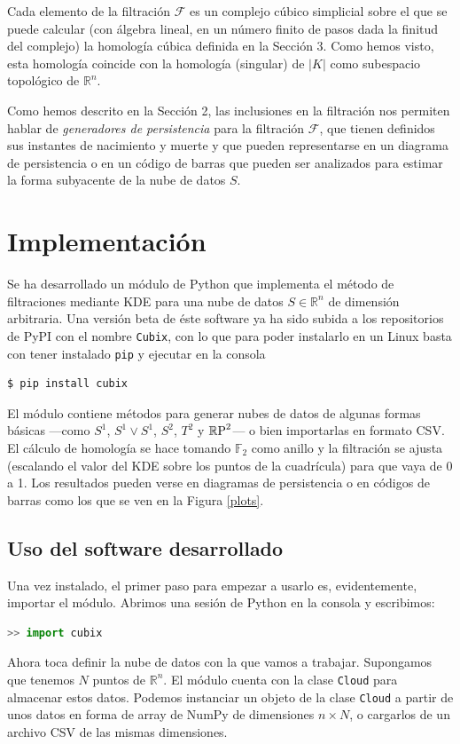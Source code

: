 \documentclass[12pt,a4paper,twoside]{article} %
\theoremstyle{plain}
\theoremstyle{definition}
\newcommand{\R}{\mathbb{R}}
\newcommand{\F}{\mathbb{F}}
\newcommand{\RP}{\mathbb{R}\textup{P}}
\begin{document}
Cada elemento de la filtración $\mathcal{F}$ es un complejo cúbico simplicial sobre el que se puede calcular (con álgebra lineal, en un número finito de pasos dada la finitud del complejo) la homología cúbica definida en la Sección 3. Como hemos visto, esta homología coincide con la homología (singular) de $\lvert K \rvert$ como subespacio topológico de $\R^n$.

Como hemos descrito en la Sección 2, las inclusiones en la filtración nos permiten hablar de \emph{generadores de persistencia} para la filtración $\mathcal{F}$, que tienen definidos sus instantes de nacimiento y muerte y que pueden representarse en un diagrama de persistencia o en un código de barras que pueden ser analizados para estimar la forma subyacente de la nube de datos $S$.

\newpage
\section{Implementación}

%
%

Se ha desarrollado un módulo de Python que implementa el método de filtraciones mediante KDE para una nube de datos $S \in \R^n$ de dimensión arbitraria. Una versión beta de éste software ya ha sido subida a los repositorios de PyPI con el nombre \texttt{Cubix}, con lo que para poder instalarlo en un Linux basta con tener instalado \texttt{pip} y ejecutar en la consola

\begin{lstlisting}[language=bash]
  $ pip install cubix 
\end{lstlisting}

El módulo contiene métodos para generar nubes de datos de algunas formas básicas ---como $S^1$, $S^1 \vee S^1$, $S^2$, $T^2$ y $\RP^2$--- o bien importarlas en formato CSV. El cálculo de homología se hace tomando $\F_2$ como anillo y la filtración se ajusta (escalando el valor del KDE sobre los puntos de la cuadrícula) para que vaya de 0 a 1. Los resultados pueden verse en diagramas de persistencia o en códigos de barras como los que se ven en la Figura \ref{plots}.

\subsection{Uso del software desarrollado}
Una vez instalado, el primer paso para empezar a usarlo es, evidentemente, importar el módulo. Abrimos una sesión de Python en la consola y escribimos:
\begin{lstlisting}[language=python]
  >> import cubix 
\end{lstlisting}
Ahora toca definir la nube de datos con la que vamos a trabajar. Supongamos que tenemos $N$ puntos de $\R^n$. El módulo cuenta con la clase \texttt{Cloud} para almacenar estos datos. Podemos instanciar un objeto de la clase \texttt{Cloud} a partir de unos datos en forma de array de NumPy de dimensiones $n \times N$, o cargarlos de un archivo CSV de las mismas dimensiones.
\end{document}
